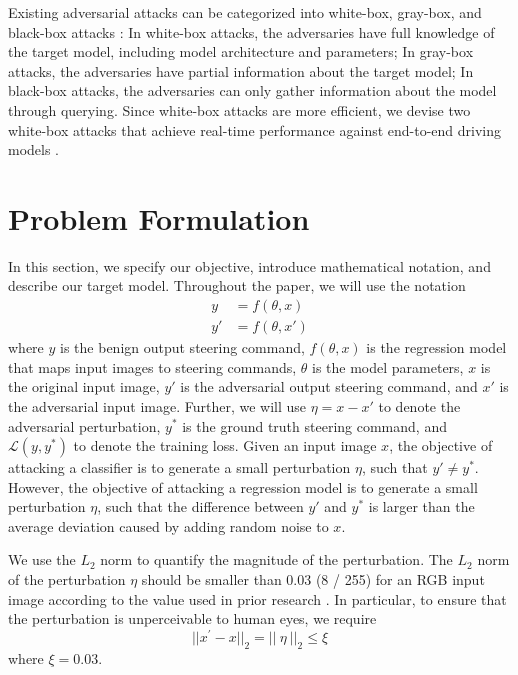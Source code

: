 Existing adversarial attacks can be categorized into white-box, gray-box, and black-box attacks \citep{REN2020346}: In white-box attacks, the adversaries have full knowledge of the target model, including model architecture and parameters; In gray-box attacks, the adversaries have partial information about the target model; In black-box attacks, the adversaries can only gather information about the model through querying. Since white-box attacks are more efficient, we devise two white-box attacks that achieve real-time performance against end-to-end driving models .


\section{Problem Formulation}
\label{section_problem_formulation}

In this section, we specify our objective, introduce mathematical notation, and describe our target model. Throughout the paper, we will use the notation
\begin{align}
y&=f(\theta, x) \\
y'&=f(\theta, x')
\end{align}
where $y$ is the benign output steering command, $f(\theta, x)$ is the regression model that maps input images to steering commands, $\theta$ is the model parameters, $x$ is the original input image, $y'$ is the adversarial output steering command, and $x'$ is the adversarial input image. Further, we will use $\eta=x-x'$ to denote the adversarial perturbation, $y^{*}$ is the ground truth steering command, and $\mathcal{L}(y, y^{*})$ to denote the training loss. Given an input image $x$, the objective of attacking a classifier is to generate a small perturbation $\eta$, such that $y' \neq y^{*}$. However, the objective of attacking a regression model is to generate a small perturbation $\eta$, such that the difference between $y'$ and $y^{*}$ is larger than the average deviation caused by adding random noise to $x$. 

We use the $L_2$ norm to quantify the magnitude of the perturbation. The $L_2$ norm of the perturbation $\eta$ should be smaller than 0.03 (8 / 255) for an RGB input image according to the value used in prior research \citep{chow2020adversarial} \citep{ACFH2020square}. In particular, to ensure that the perturbation is unperceivable to human eyes, we require \begin{equation}
||x^{'}-x||_{2} = ||\ {\eta}\ ||_{2} \leq \xi
\end{equation}
where $\xi = 0.03$.


